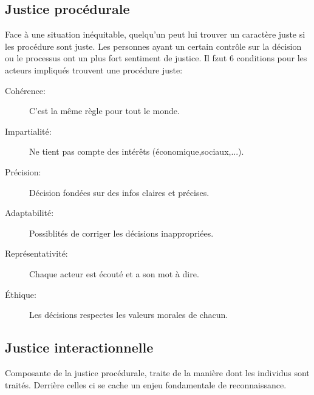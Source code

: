 \documentclass[11pt]{article} %
\begin{document}
	\subsection{Justice procédurale}
		Face à une situation inéquitable, quelqu'un peut lui trouver un caractère juste si les procédure sont 
		juste. Les personnes ayant un certain contrôle sur la décision ou le processus ont un plus fort 
		sentiment de justice. Il fzut 6 conditions pour les acteurs impliqués trouvent une procédure juste:
		\begin{description}
			\item[Cohérence:] C'est la même règle pour tout le monde.
			\item[Impartialité: ] Ne tient pas compte des intérêts (économique,sociaux,...).
			\item[Précision: ] Décision fondées sur des infos claires et précises.
			\item[Adaptabilité: ] Possiblités de corriger les décisions inappropriées.
			\item[Représentativité: ] Chaque acteur est écouté et a son mot à dire.
			\item[Éthique: ] Les décisions respectes les valeurs morales de chacun.
		\end{description}
	\subsection{Justice interactionnelle}
		Composante de la justice procédurale, traite de la manière dont les individus sont traités. Derrière 
		celles ci se cache un enjeu fondamentale de reconnaissance.
\end{document}
